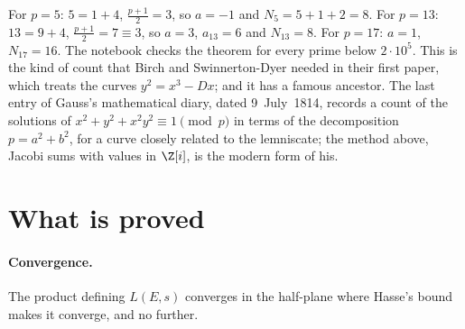 For $p=5$: $5=1+4$, $\frac{p+1}2=3$, so $a=-1$ and $N_5=5+1+2=8$. For $p=13$: $13=9+4$, $\frac{p+1}2=7\equiv3$, so $a=3$, $a_{13}=6$ and $N_{13}=8$. For
$p=17$: $a=1$, $N_{17}=16$. The notebook checks the theorem for every prime below $2\cdot10^5$. This is the kind of count that Birch and Swinnerton-Dyer
needed in their first paper, which treats the curves $y^2=x^3-Dx$; and it has a famous ancestor. The last entry of Gauss's mathematical diary, dated
9~July~1814, records a count of the solutions of $x^2+y^2+x^2y^2\equiv1\pmod p$ in terms of the decomposition $p=a^2+b^2$, for a curve closely related
to the lemniscate; the method above, Jacobi sums with values in $\Z[i]$, is the modern form of his.

\section{What is proved}

\paragraph{Convergence.} The product defining $L(E,s)$ converges in the half-plane where Hasse's bound makes it converge, and no further.

